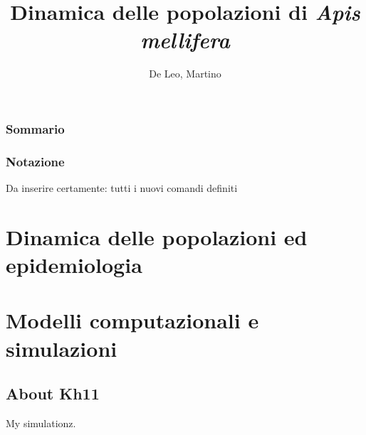 \documentclass[11pt,a4paper,oneside,hidelinks]{book} %
\author{De Leo, Martino}
\title{Dinamica delle popolazioni di \emph{Apis mellifera}}
\begin{document}
\maketitle %

\frontmatter

\section*{Sommario}


\section*{Notazione}
Da inserire certamente: tutti i nuovi comandi definiti

\cleardoublepage

\tableofcontents

\listoffigures



\mainmatter

\clearpage
\part{Dinamica delle popolazioni ed epidemiologia}






\part{Modelli computazionali e simulazioni}

\chapter{About Kh11}
My simulationz.





\appendix



\backmatter

\cleardoublepage
{}
\nocite{*} %
\printbibliography
\end{document}
